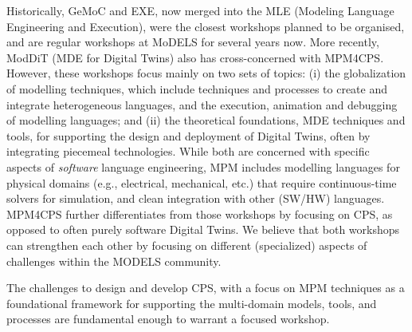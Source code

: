 Historically, GeMoC and EXE, now merged into the MLE (Modeling Language Engineering
and Execution), were the closest workshops planned to be organised, and are regular
workshops at MoDELS for several years now. More recently, ModDiT (MDE for Digital
Twins) also has cross-concerned with MPM4CPS.
However, these workshops focus mainly on two sets of topics: (i) the globalization
of modelling techniques, which include techniques and processes to create and 
integrate heterogeneous languages, and the execution, animation and debugging of
modelling languages; and (ii) the theoretical foundations, MDE techniques and tools,
for supporting the design and deployment of Digital Twins, often by integrating
piecemeal technologies. 
While both are concerned with specific aspects of \emph{software} language engineering,
MPM includes modelling languages for physical domains (e.g., electrical, 
mechanical, etc.) that require continuous-time solvers for simulation, and clean
integration with other (SW/HW) languages.
MPM4CPS further differentiates from those workshops by focusing on CPS, as opposed
to often purely software Digital Twins. 
We believe that both workshops can strengthen each other by focusing on different 
(specialized) aspects of challenges within the MODELS community.

The challenges to design and develop CPS, with a focus on MPM techniques as a 
foundational framework for supporting the multi-domain models, tools, and 
processes are fundamental enough to warrant a focused workshop.
